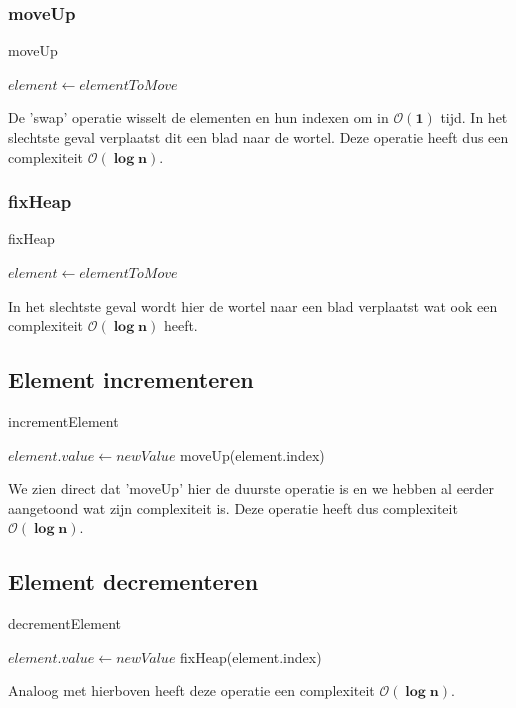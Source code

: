 \documentclass[a4paper,12pt]{report}
\newcommand{\bigO}[1]{$\bm{\mathcal{O}(#1)}$} %
\begin{document}
\subsubsection{moveUp}
\begin{algorithm}[H]
\caption{moveUp}
\SetAlgoLined	
\DontPrintSemicolon
$element \gets elementToMove$\;
\end{algorithm}
De 'swap' operatie wisselt de elementen en hun indexen om in \bigO{1} tijd. In het slechtste geval verplaatst dit een blad naar de wortel. Deze operatie heeft dus een complexiteit \bigO{\log n}.
\subsubsection{fixHeap}
\begin{algorithm}[H]
\caption{fixHeap}
\SetAlgoLined	
\DontPrintSemicolon
$element \gets elementToMove$\;
\end{algorithm}
In het slechtste geval wordt hier de wortel naar een blad verplaatst wat ook een complexiteit \bigO{\log n} heeft.
\subsection{Element incrementeren}
\begin{algorithm}[H]
\caption{incrementElement}
\SetAlgoLined	
\DontPrintSemicolon
$element.value \gets newValue$\;
moveUp(element.index)\;	
\end{algorithm}
We zien direct dat 'moveUp' hier de duurste operatie is en we hebben al eerder aangetoond wat zijn complexiteit is. Deze operatie heeft dus complexiteit \bigO{\log n}.
\subsection{Element decrementeren}
\begin{algorithm}[H]
\caption{decrementElement}
\SetAlgoLined	
\DontPrintSemicolon
$element.value \gets newValue$\;
fixHeap(element.index)\;		
\end{algorithm}
Analoog met hierboven heeft deze operatie een complexiteit \bigO{\log n}.
\end{document}
